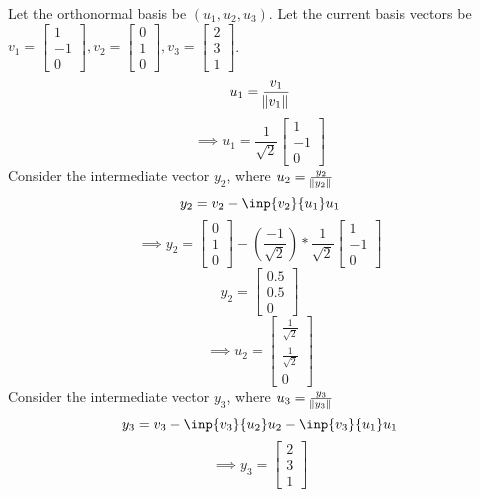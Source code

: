 \documentclass[solution,addpoints,12pt]{exam}
\newenvironment{Solution}{\begin{solution}}{\end{solution}}
\begin{document}
\begin{questions}
\begin{parts}
    \begin{Solution}
    Let the orthonormal basis be $\left(u_{1},u_{2},u_{3} \right)$. Let the current basis vectors be $v_{1} = \begin{bmatrix}
        1 \\ -1 \\ 0
    \end{bmatrix}, v_{2} = \begin{bmatrix}
        0 \\ 1 \\ 0
    \end{bmatrix}, v_{3} = \begin{bmatrix}
        2 \\ 3 \\ 1
    \end{bmatrix}$.
    \[u_{1} = \frac{v_{1}}{\norm{v_{1}}}\]
    \[\implies u_{1} = \frac{1}{\sqrt{2}}\begin{bmatrix}
        1 \\ -1 \\ 0
    \end{bmatrix}\]
    Consider the intermediate vector $y_{2}$, where $u_{2} = \frac{y_{2}}{\norm{y_{2}}}$
    \[y_{2} = v_{2} - \inp{v_{2}}{u_{1}}u_{1}\]
    \[\implies y_{2} = \begin{bmatrix}
        0 \\ 1 \\ 0
    \end{bmatrix} - (\frac{-1}{\sqrt{2}})*\frac{1}{\sqrt{2}}\begin{bmatrix}
        1 \\ -1 \\ 0
    \end{bmatrix}\]
    \[y_{2} = \begin{bmatrix}
        0.5 \\ 0.5 \\ 0
    \end{bmatrix}\]
    \[\implies u_{2} = \begin{bmatrix}
        \frac{1}{\sqrt{2}} \\ \frac{1}{\sqrt{2}} \\ 0
    \end{bmatrix}\]
    Consider the intermediate vector $y_{3}$, where $u_{3} = \frac{y_{3}}{\norm{y_{3}}}$
    \[y_{3} = v_{3} - \inp{v_{3}}{u_{2}}u_{2} - \inp{v_{3}}{u_{1}}u_{1}\]
    \[\implies y_{3} = \begin{bmatrix}
        2 \\ 3 \\ 1

\end{bmatrix}\]
\end{Solution}
\end{parts}
\end{questions}
\end{document}
